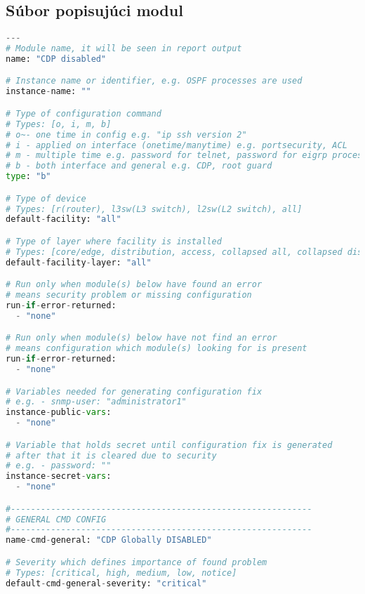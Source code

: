 \subsection{Súbor popisujúci modul}

\begin{lstlisting}[frame=single,numbers=right,caption={Konfiguračný súbor cdp\_module.yaml, ktorý obsahuje informácie na nájdenie problému, jeho odstránenie a informácie do správy},label=lst:lldp,basicstyle=\ttfamily\small, keywordstyle=\color{black},language=python,breaklines=true]
---
# Module name, it will be seen in report output
name: "CDP disabled"

# Instance name or identifier, e.g. OSPF processes are used
instance-name: ""

# Type of configuration command
# Types: [o, i, m, b]
# o~- one time in config e.g. "ip ssh version 2"
# i - applied on interface (onetime/manytime) e.g. portsecurity, ACL
# m - multiple time e.g. password for telnet, password for eigrp processes
# b - both interface and general e.g. CDP, root guard
type: "b"

# Type of device
# Types: [r(router), l3sw(L3 switch), l2sw(L2 switch), all]
default-facility: "all"

# Type of layer where facility is installed
# Types: [core/edge, distribution, access, collapsed all, collapsed distribution access, collapsed core distribution, all]
default-facility-layer: "all"

# Run only when module(s) below have found an error
# means security problem or missing configuration
run-if-error-returned: 
  - "none"

# Run only when module(s) below have not find an error
# means configuration which module(s) looking for is present
run-if-error-returned: 
  - "none"

# Variables needed for generating configuration fix
# e.g. - snmp-user: "administrator1"
instance-public-vars:
  - "none"

# Variable that holds secret until configuration fix is generated
# after that it is cleared due to security
# e.g. - password: "" 
instance-secret-vars:
  - "none"

#------------------------------------------------------------
# GENERAL CMD CONFIG
#------------------------------------------------------------
name-cmd-general: "CDP Globally DISABLED"

# Severity which defines importance of found problem 
# Types: [critical, high, medium, low, notice]
default-cmd-general-severity: "critical"


\end{lstlisting}
